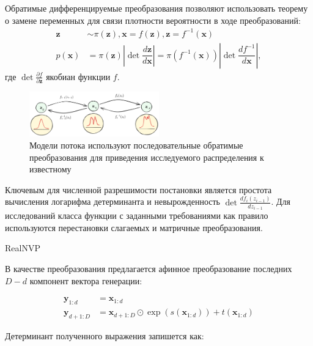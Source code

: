 Обратимые дифференцируемые преобразования позволяют использовать теорему о замене переменных для связи плотности вероятности в ходе преобразований:
\begin{equation}
    \begin{aligned}
        \mathbf{z} &\sim \pi(\mathbf{z}), \mathbf{x} = f(\mathbf{z}), \mathbf{z} = f^{-1}(\mathbf{x}) \\
        p(\mathbf{x}) 
        &= \pi(\mathbf{z}) \left\vert \det \dfrac{d \mathbf{z}}{d \mathbf{x}} \right\vert  
        = \pi(f^{-1}(\mathbf{x})) \left\vert \det \dfrac{d f^{-1}}{d \mathbf{x}} \right\vert,
    \end{aligned}
\end{equation}
где $\det \frac{\partial f}{\partial\mathbf{z}}$ якобиан функции $f$.

\begin{figure}[h]
    \centering
    \includegraphics[width=0.5\textwidth]{assets/ml/generation/flow.excalidraw.png}
    \caption{Модели потока используют последовательные обратимые преобразования для приведения исследуемого распределения к известному}
    \label{flow}
\end{figure}

Ключевым для численной разрешимости постановки является простота вычисления логарифма детерминанта и невырожденность $\det \frac{d f_i(z_{i-1})}{d z_{i-1}}$. 
Для исследований класса функции с заданными требованиями как правило используются перестановки слагаемых и матричные преобразования.

RealNVP

В качестве преобразования предлагается афинное преобразование последних $D-d$ компонент вектора генерации:  

\begin{equation}
    \begin{aligned}
        \mathbf{y}_{1:d} &= \mathbf{x}_{1:d} \\ 
        \mathbf{y}_{d+1:D} &= \mathbf{x}_{d+1:D} \odot \exp({s(\mathbf{x}_{1:d})}) + t(\mathbf{x}_{1:d})
    \end{aligned}
\end{equation}

Детерминант полученного выражения запишется как:

